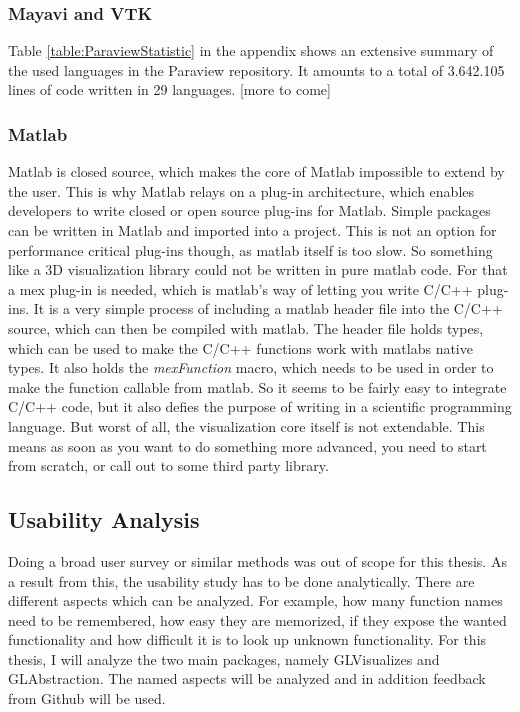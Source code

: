 \subsubsection{Mayavi and VTK}

Table \ref{table:ParaviewStatistic} in the appendix shows an extensive summary of the used languages in the Paraview repository.
It amounts to a total of 3.642.105 lines of code written in 29 languages.
[more to come]

\subsubsection{Matlab}

Matlab is closed source, which makes the core of Matlab impossible to extend by the user.
This is why Matlab relays on a plug-in architecture, which enables developers to write closed or open source plug-ins for Matlab. 
Simple packages can be written in Matlab and imported into a project.
This is not an option for performance critical plug-ins though, as matlab itself is too slow.
So something like a 3D visualization library could not be written in pure matlab code. 
For that a mex plug-in is needed, which is matlab's way of letting you write C/C++ plug-ins.
It is a very simple process of including a matlab header file into the C/C++ source, which can then be compiled with matlab.
The header file holds types, which can be used to make the C/C++ functions work with matlabs native types.
It also holds the \textit{mexFunction} macro, which needs to be used in order to make the function callable from matlab.
So it seems to be fairly easy to integrate C/C++ code, but it also defies the purpose of writing in a scientific programming language.
But worst of all, the visualization core itself is not extendable. This means as soon as you want to do something more advanced, you need to start from scratch, or call out to some third party library.



\subsection{Usability Analysis}
Doing a broad user survey or similar methods was out of scope for this thesis.
As a result from this, the usability study has to be done analytically.
There are different aspects which can be analyzed. For example, how many function names need to be remembered, how easy they are memorized, if they expose the wanted functionality and how difficult it is to look up unknown functionality.
For this thesis, I will analyze the two main packages, namely GLVisualizes and GLAbstraction. 
The named aspects will be analyzed and in addition feedback from Github will be used.

